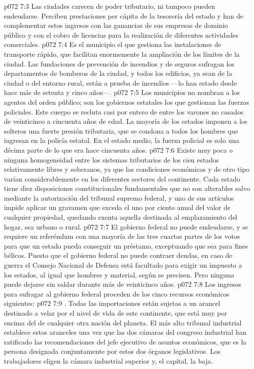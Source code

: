 \vs p072 7:3 \pc Las ciudades carecen de poder tributario, ni tampoco pueden endeudarse. Perciben prestaciones per cápita de la tesorería del estado y han de complementar estos ingresos con las ganancias de sus empresas de dominio público y con el cobro de licencias para la realización de diferentes actividades comerciales.
\vs p072 7:4 Es el municipio el que gestiona las instalaciones de transporte rápido, que facilitan enormemente la ampliación de los límites de la ciudad. Las fundaciones de prevención de incendios y de seguros sufragan los departamentos de bomberos de la ciudad, y todos los edificios, ya sean de la ciudad o del entorno rural, están a prueba de incendios ---lo han estado desde hace más de setenta y cinco años---.
\vs p072 7:5 Los municipios no nombran a los agentes del orden público; son los gobiernos estatales los que gestionan las fuerzas policiales. Este cuerpo se recluta casi por entero de entre los varones no casados de veinticinco a cincuenta años de edad. La mayoría de los estados imponen a los solteros una fuerte presión tributaria, que se condona a todos los hombres que ingresan en la policía estatal. En el estado medio, la fuerza policial es solo una décima parte de lo que era hace cincuenta años.
\vs p072 7:6 \pc Existe muy poca o ninguna homogeneidad entre los sistemas tributarios de los cien estados relativamente libres y soberanos, ya que las condiciones económicas y de otro tipo varían considerablemente en los diferentes sectores del continente. Cada estado tiene diez disposiciones constitucionales fundamentales que no son alterables salvo mediante la autorización del tribunal supremo federal, y uno de sus artículos impide aplicar un gravamen que exceda el uno por ciento anual del valor de cualquier propiedad, quedando exenta aquella destinada al emplazamiento del hogar, sea urbano o rural.
\vs p072 7:7 El gobierno federal no puede endeudarse, y se requiere un referéndum con una mayoría de las tres cuartas partes de los votos para que un estado pueda conseguir un préstamo, exceptuando que sea para fines bélicos. Puesto que el gobierno federal no puede contraer deudas, en caso de guerra el Consejo Nacional de Defensa está facultado para exigir un impuesto a los estados, al igual que hombres y material, según se precisen. Pero ninguna puede dejarse sin saldar durante más de veinticinco años.
\vs p072 7:8 \pc Los ingresos para sufragar al gobierno federal proceden de los cinco recursos económicos siguientes:
\vs p072 7:9 . Todas las importaciones están sujetas a un arancel destinado a velar por el nivel de vida de este continente, que está muy por encima del de cualquier otra nación del planeta. El más alto tribunal industrial establece estos aranceles una vez que las dos cámaras del congreso industrial han ratificado las recomendaciones del jefe ejecutivo de asuntos económicos, que es la persona designada conjuntamente por estos dos órganos legislativos. Los trabajadores eligen la cámara industrial superior y, el capital, la baja.
